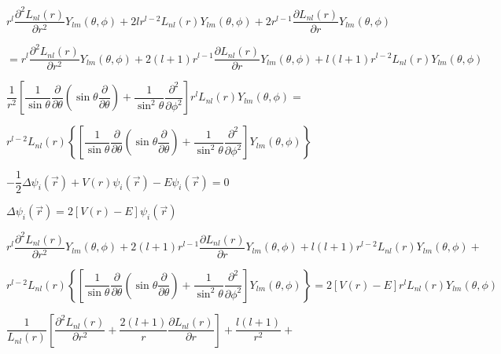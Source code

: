 \documentclass{jarticle}%
\begin{document}
$r^{l}\dfrac{\partial^{2}L_{nl}\left(  r\right)  }{\partial r^{2}}%
Y_{lm}\left(  \theta,\phi\right)  +2lr^{l-2}L_{nl}\left(  r\right)
Y_{lm}\left(  \theta,\phi\right)  +2r^{l-1}\dfrac{\partial L_{nl}\left(
r\right)  }{\partial r}Y_{lm}\left(  \theta,\phi\right)  $

$=r^{l}\dfrac{\partial^{2}L_{nl}\left(  r\right)  }{\partial r^{2}}%
Y_{lm}\left(  \theta,\phi\right)  +2\left(  l+1\right)  r^{l-1}\dfrac{\partial
L_{nl}\left(  r\right)  }{\partial r}Y_{lm}\left(  \theta,\phi\right)
+l\left(  l+1\right)  r^{l-2}L_{nl}\left(  r\right)  Y_{lm}\left(  \theta
,\phi\right)  $

$\dfrac{1}{r^{2}}\left[  \dfrac{1}{\sin\theta}\dfrac{\partial}{\partial\theta
}\left(  \sin\theta\dfrac{\partial}{\partial\theta}\right)  +\dfrac{1}%
{\sin^{2}\theta}\dfrac{\partial^{2}}{\partial\phi^{2}}\right]  r^{l}%
L_{nl}\left(  r\right)  Y_{lm}\left(  \theta,\phi\right)  =$

$r^{l-2}L_{nl}\left(  r\right)  \left\{  \left[  \dfrac{1}{\sin\theta}%
\dfrac{\partial}{\partial\theta}\left(  \sin\theta\dfrac{\partial}%
{\partial\theta}\right)  +\dfrac{1}{\sin^{2}\theta}\dfrac{\partial^{2}%
}{\partial\phi^{2}}\right]  Y_{lm}\left(  \theta,\phi\right)  \right\}  $

$-\dfrac{1}{2}\Delta\psi_{i}\left(  \vec{r}\right)  +V\left(  r\right)
\psi_{i}\left(  \vec{r}\right)  -E\psi_{i}\left(  \vec{r}\right)  =0$

$\Delta\psi_{i}\left(  \vec{r}\right)  =2\left[  V\left(  r\right)  -E\right]
\psi_{i}\left(  \vec{r}\right)  $

$r^{l}\dfrac{\partial^{2}L_{nl}\left(  r\right)  }{\partial r^{2}}%
Y_{lm}\left(  \theta,\phi\right)  +2\left(  l+1\right)  r^{l-1}\dfrac{\partial
L_{nl}\left(  r\right)  }{\partial r}Y_{lm}\left(  \theta,\phi\right)
+l\left(  l+1\right)  r^{l-2}L_{nl}\left(  r\right)  Y_{lm}\left(  \theta
,\phi\right)  +$

$r^{l-2}L_{nl}\left(  r\right)  \left\{  \left[  \dfrac{1}{\sin\theta}%
\dfrac{\partial}{\partial\theta}\left(  \sin\theta\dfrac{\partial}%
{\partial\theta}\right)  +\dfrac{1}{\sin^{2}\theta}\dfrac{\partial^{2}%
}{\partial\phi^{2}}\right]  Y_{lm}\left(  \theta,\phi\right)  \right\}
=2\left[  V\left(  r\right)  -E\right]  r^{l}L_{nl}\left(  r\right)
Y_{lm}\left(  \theta,\phi\right)  $

$\dfrac{1}{L_{nl}\left(  r\right)  }\left[  \dfrac{\partial^{2}L_{nl}\left(
r\right)  }{\partial r^{2}}+\dfrac{2\left(  l+1\right)  }{r}\dfrac{\partial
L_{nl}\left(  r\right)  }{\partial r}\right]  +\dfrac{l\left(  l+1\right)
}{r^{2}}+$
\end{document}
